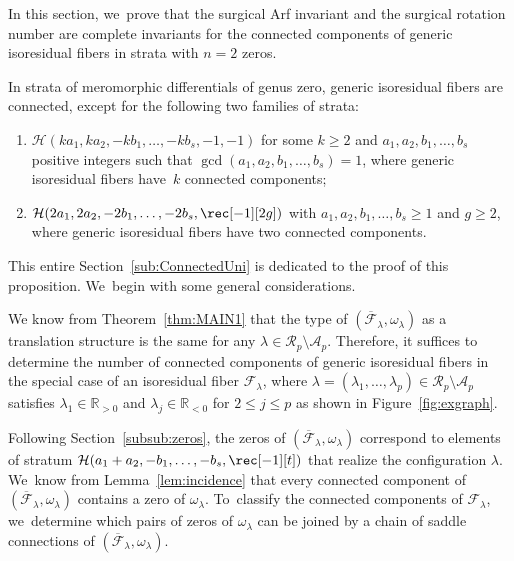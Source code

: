\label{sub:ConnectedUni}

In this section, we~prove that the surgical Arf invariant and the surgical rotation number are complete invariants for the connected components of generic isoresidual fibers in strata with $n=2$ zeros.

\begin{prop}\label{prop:MAIN5}
In strata of meromorphic differentials of genus zero, generic isoresidual fibers are connected, except for the following two families of strata:
\begin{enumerate}
\item $\mathcal{H}(ka_{1},ka_{2},-kb_{1},\dots,-kb_{s},-1,-1)$ for some $k \geq 2$ and $a_{1},a_{2},b_{1},\dots,b_{s}$ positive integers such that $\gcd(a_{1},a_{2},b_{1},\dots,b_{s})=1$, where generic isoresidual fibers have~$k$ connected components;
\item $\mathcal{H}(2a_{1},2a_{2},-2b_{1},\dots,-2b_{s},\rec[-1][2g])$ with $a_{1},a_{2},b_{1},\dots,b_{s}\geq 1$ and $g \geq 2$, where generic isoresidual fibers have two connected components.
\end{enumerate}
\end{prop}

This entire Section~\ref{sub:ConnectedUni} is dedicated to the proof of this proposition. We~begin with some general considerations.

We know from Theorem~\ref{thm:MAIN1} that the type of $(\overline{\mathcal{F}}_{\lambda}, \omega_\lambda)$ as a translation structure is the same for any $\lambda \in \mathcal{R}_{p} \setminus \mathcal{A}_{p}$. Therefore, it suffices to determine the number of connected components of generic isoresidual fibers in the special case of an isoresidual fiber $\mathcal{F}_{\lambda}$, where $\lambda=(\lambda_{1},\dots,\lambda_{p})\in \mathcal{R}_{p} \setminus \mathcal{A}_{p}$ satisfies $\lambda_{1} \in \mathbb{R}_{>0}$ and $\lambda_{j} \in \mathbb{R}_{<0}$ for $2 \leq j \leq p$ as shown in Figure~\ref{fig:exgraph}.

Following Section~\ref{subsub:zeros}, the zeros of $(\overline{\mathcal{F}}_{\lambda}, \omega_\lambda)$ correspond to elements of stratum $\mathcal{H}(a_{1}+a_{2},-b_{1},\dots,-b_{s},\rec[-1][t])$ that realize the configuration $\lambda$. We~know from Lemma~\ref{lem:incidence} that every connected component of $(\overline{\mathcal{F}}_{\lambda}, \omega_\lambda)$ contains a zero of $\omega_{\lambda}$. To~classify the connected components of $\mathcal{F}_{\lambda}$, we~determine which pairs of zeros of $\omega_{\lambda}$ can be joined by a chain of saddle connections of $(\overline{\mathcal{F}}_{\lambda}, \omega_\lambda)$.

